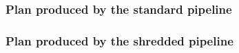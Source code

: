 \documentclass{article}
\def\sojoin{\setbox0=\hbox{$\bowtie$}%
  \rule[-.02ex]{.25em}{.4pt}\llap{\rule[\ht0]{.25em}{.4pt}}}
\def\sleftouterjoin{\mathbin{\sojoin\mkern-5.8mu\bowtie}}
\begin{document}
\subsubsection{Plan produced by the standard pipeline}


\medskip


\medskip

\subsubsection{Plan produced by the shredded pipeline}
\end{document}
